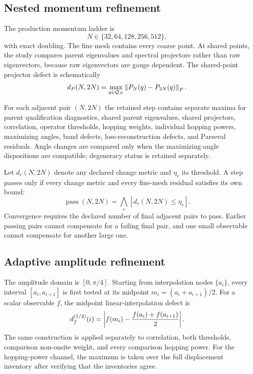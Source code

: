 \subsection{Nested momentum refinement}

The production momentum ladder is
\begin{equation}
 N\in\{32,64,128,256,512\},
 \label{eq:momentum-ladder}
\end{equation}
with exact doubling.  The fine mesh contains every coarse point.  At shared points, the
study compares parent eigenvalues and spectral projectors rather than raw eigenvectors,
because raw eigenvectors are gauge dependent.  The shared-point projector defect is
schematically
\begin{equation}
 d_P(N,2N)=\max_{q\in\mathcal Q_N}
 \left\lVert P_N(q)-P_{2N}(q)\right\rVert_F.
 \label{eq:projector-refinement}
\end{equation}

For each adjacent pair $(N,2N)$ the retained step contains separate maxima for parent
qualification diagnostics, shared parent eigenvalues, shared projectors, correlation,
operator thresholds, hopping weights, individual hopping powers, maximizing angles,
band defects, loss-reconstruction defects, and Parseval residuals.  Angle changes are
compared only when the maximizing-angle dispositions are compatible; degeneracy status
is retained separately.

Let $d_{r}(N,2N)$ denote any declared change metric and $\eta_r$ its threshold.  A step
passes only if every change metric and every fine-mesh residual satisfies its own bound:
\begin{equation}
 \operatorname{pass}(N,2N)
 =\bigwedge_r[d_r(N,2N)\le\eta_r].
 \label{eq:momentum-pass}
\end{equation}
Convergence requires the declared number of final adjacent pairs to pass.  Earlier
passing pairs cannot compensate for a failing final pair, and one small observable
cannot compensate for another large one.

\subsection{Adaptive amplitude refinement}

The amplitude domain is $[0,\pi/4]$.  Starting from interpolation nodes
$\{a_i\}$, every interval $[a_i,a_{i+1}]$ is first tested at its midpoint
$m_i=(a_i+a_{i+1})/2$.  For a scalar observable $f$, the midpoint linear-interpolation
defect is
\begin{equation}
 d_f^{(1/2)}(i)
 =\left\lvert f(m_i)-\frac{f(a_i)+f(a_{i+1})}{2}\right\rvert.
 \label{eq:midpoint-defect}
\end{equation}
The same construction is applied separately to correlation, both thresholds,
comparison non-onsite weight, and every comparison hopping power.  For the hopping-power
channel, the maximum is taken over the full displacement inventory after verifying that
the inventories agree.

